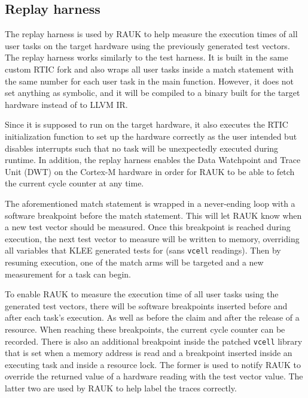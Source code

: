 \subsection{Replay harness}
The replay harness is used by RAUK to help measure the execution times of all
user tasks on the target hardware using the previously generated test vectors.
The replay harness works similarly to the test harness. It is built in the same
custom RTIC fork and also wraps all user tasks inside a match statement with
the same number for each user task in the main function. However, it does not
set anything as symbolic, and it will be compiled to a binary built for the
target hardware instead of to LLVM IR\@.

Since it is supposed to run on the target hardware, it also executes the RTIC
initialization function to set up the hardware correctly as the user intended
but disables interrupts such that no task will be unexpectedly executed during
runtime. In addition, the replay harness enables the Data Watchpoint and Trace
Unit (DWT) on the Cortex-M hardware in order for RAUK to be able to fetch the
current cycle counter at any time.

The aforementioned match statement is wrapped in a never-ending loop with a
software breakpoint before the match statement. This will let RAUK know when a
new test vector should be measured. Once this breakpoint is reached during
execution, the next test vector to measure will be written to memory,
overriding all variables that KLEE generated tests for (sans \texttt{vcell}
readings). Then by resuming execution, one of the match arms will be targeted
and a new measurement for a task can begin.

To enable RAUK to measure the execution time of all user tasks using the
generated test vectors, there will be software breakpoints inserted before and
after each task's execution. As well as before the claim and after the release
of a resource. When reaching these breakpoints, the current cycle counter can be
recorded. There is also an additional breakpoint inside the patched
\texttt{vcell} library that is set when a memory address is read and a breakpoint
inserted inside an executing task and inside a resource lock. The former is
used to notify RAUK to override the returned value of a hardware reading with
the test vector value. The latter two are used by RAUK to help label the
traces correctly.



